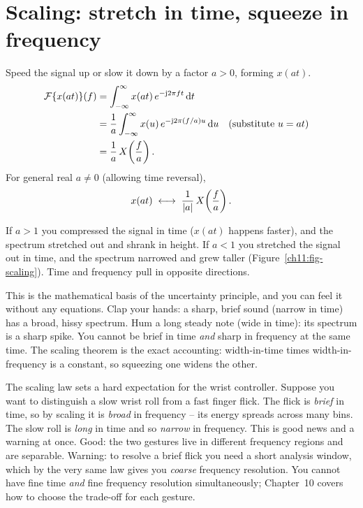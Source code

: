 \section{Scaling: stretch in time, squeeze in frequency}
\label{ch11:scaling}

Speed the signal up or slow it down by a factor $a > 0$, forming $x(at)$.
\begin{align}
\mathcal{F}\{x(at)\}(f)
&= \int_{-\infty}^{\infty} x(at)\, e^{-\mathrm{j} 2\pi f t}\, \mathrm{d} t \nonumber\\
&= \frac{1}{a}\int_{-\infty}^{\infty} x(u)\, e^{-\mathrm{j} 2\pi (f/a) u}\, \mathrm{d} u
&&\text{(substitute } u = at\text{)} \nonumber\\
&= \frac{1}{a}\, X\!\left(\frac{f}{a}\right).
\label{ch11:scaling-result}
\end{align}
For general real $a \ne 0$ (allowing time reversal),
\[
x(at) \;\longleftrightarrow\; \frac{1}{\lvert a\rvert}\, X\!\left(\frac{f}{a}\right).
\]

If $a > 1$ you compressed the signal in time ($x(at)$ happens faster), and the
spectrum stretched out and shrank in height. If $a < 1$ you stretched the signal
out in time, and the spectrum narrowed and grew taller (Figure~\ref{ch11:fig-scaling}).
Time and frequency pull in opposite directions.

\begin{intuitionbox}
This is the mathematical basis of the uncertainty principle, and you can feel it
without any equations. Clap your hands: a sharp, brief sound (narrow in time) has
a broad, hissy spectrum. Hum a long steady note (wide in time): its spectrum is
a sharp spike. You cannot be brief in time \emph{and} sharp in frequency at the
same time. The scaling theorem is the exact accounting: width-in-time times
width-in-frequency is a constant, so squeezing one widens the other.
\end{intuitionbox}

\begin{goalbox}
The scaling law sets a hard expectation for the wrist controller. Suppose you
want to distinguish a slow wrist roll from a fast finger flick. The flick is
\emph{brief} in time, so by scaling it is \emph{broad} in frequency -- its energy
spreads across many bins. The slow roll is \emph{long} in time and so
\emph{narrow} in frequency. This is good news and a warning at once. Good: the
two gestures live in different frequency regions and are separable. Warning: to
resolve a brief flick you need a short analysis window, which by the very same
law gives you \emph{coarse} frequency resolution. You cannot have fine time
\emph{and} fine frequency resolution simultaneously; Chapter~10 covers
how to choose the trade-off for each gesture.
\end{goalbox}

